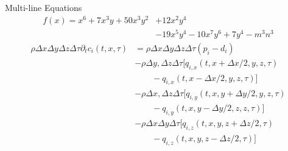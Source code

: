 \documentclass{beamer}       %
\begin{document}
\begin{frame}{Multi-line Equations}  %
     \begin{align*}
         f(x) = x^{6} + 7x^{3}y + 50x^{3}y^{2} &+ 12x^{2}y^{4} \\
         &- 19x^{5}y^{4} - 10x^{7}y^{6} + 7y^{4} - m^{3}n^{3}
     \end{align*} \pause   %
     \begin{align*}
         \rho \Delta x \Delta y \Delta z \Delta \tau \partial_{t} c_{i}(t,x,\tau) 
         &= \rho \Delta x \Delta y \Delta z \Delta \tau (p_{i}-d_{i})  \\
         &- \rho \Delta y, \Delta z \Delta \tau [q_{i,x}(t,x + \Delta x/2, y, z, \tau)\\
         &\qquad - q_{i,x}(t,x - \Delta x/2, y, z, \tau)]\\
         &- \rho \Delta x, \Delta z \Delta  \tau [q_{i,y}(t,x,y+\Delta y/2, y, z, \tau)\\
         &\qquad - q_{i,y}(t,x,y - \Delta y/2, z, z, \tau)]\\
         &- \rho \Delta x \Delta y \Delta \tau[q_{i,z}(t,x,y,z + \Delta z/2, \tau) \\
         &\qquad - q_{i,z}(t,x,y,z-\Delta z/2, \tau)]
     \end{align*}
\end{frame}
\end{document}
